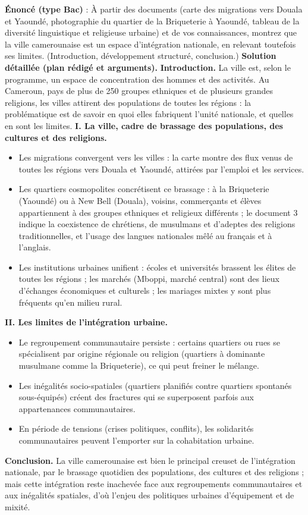 \documentclass[11pt]{article}
\begin{document}
\begin{exoresolu}
\textbf{Énoncé (type Bac)} : À partir des documents (carte des migrations vers Douala et Yaoundé, photographie du quartier de la Briqueterie à Yaoundé, tableau de la diversité linguistique et religieuse urbaine) et de vos connaissances, montrez que la ville camerounaise est un espace d'intégration nationale, en relevant toutefois ses limites. (Introduction, développement structuré, conclusion.)
\tcblower
\textbf{Solution détaillée (plan rédigé et arguments).}
\textbf{Introduction.} La ville est, selon le programme, un espace de concentration des hommes et des activités. Au Cameroun, pays de plus de 250 groupes ethniques et de plusieurs grandes religions, les villes attirent des populations de toutes les régions : la problématique est de savoir en quoi elles fabriquent l'unité nationale, et quelles en sont les limites.
\textbf{I. La ville, cadre de brassage des populations, des cultures et des religions.}
\begin{itemize}
\item Les migrations convergent vers les villes : la carte montre des flux venus de toutes les régions vers Douala et Yaoundé, attirées par l'emploi et les services.
\item Les quartiers cosmopolites concrétisent ce brassage : à la Briqueterie (Yaoundé) ou à New Bell (Douala), voisins, commerçants et élèves appartiennent à des groupes ethniques et religieux différents ; le document 3 indique la coexistence de chrétiens, de musulmans et d'adeptes des religions traditionnelles, et l'usage des langues nationales mêlé au français et à l'anglais.
\item Les institutions urbaines unifient : écoles et universités brassent les élites de toutes les régions ; les marchés (Mboppi, marché central) sont des lieux d'échanges économiques et culturels ; les mariages mixtes y sont plus fréquents qu'en milieu rural.
\end{itemize}
\textbf{II. Les limites de l'intégration urbaine.}
\begin{itemize}
\item Le regroupement communautaire persiste : certains quartiers ou rues se spécialisent par origine régionale ou religion (quartiers à dominante musulmane comme la Briqueterie), ce qui peut freiner le mélange.
\item Les inégalités socio-spatiales (quartiers planifiés contre quartiers spontanés sous-équipés) créent des fractures qui se superposent parfois aux appartenances communautaires.
\item En période de tensions (crises politiques, conflits), les solidarités communautaires peuvent l'emporter sur la cohabitation urbaine.
\end{itemize}
\textbf{Conclusion.} La ville camerounaise est bien le principal creuset de l'intégration nationale, par le brassage quotidien des populations, des cultures et des religions ; mais cette intégration reste inachevée face aux regroupements communautaires et aux inégalités spatiales, d'où l'enjeu des politiques urbaines d'équipement et de mixité.
\end{exoresolu}
\end{document}
